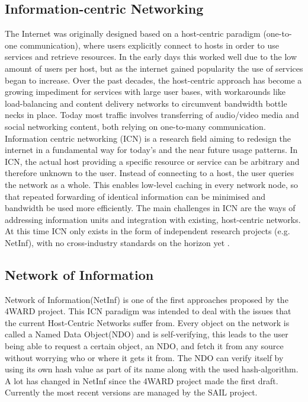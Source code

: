 \subsection{Information-centric Networking}
\label{sec:netinf}
The Internet was originally designed based on a host-centric paradigm (one-to-one communication), where users explicitly connect to hosts in order to use services and retrieve resources. In the early days this worked well due to the low amount of users per host, but as the internet gained popularity the use of services began to increase. Over the past decades, the host-centric approach has become a growing impediment for services with large user bases, with workarounds like load-balancing and content delivery networks to circumvent bandwidth bottle necks in place. Today most traffic involves transferring of audio/video media and social networking content, both relying on one-to-many communication. Information centric networking (ICN) is a research field aiming to redesign the internet in a fundamental way for today's and the near future usage patterns. In ICN, the actual host providing a specific resource or service can be arbitrary and therefore unknown to the user. Instead of connecting to a host, the user queries the network as a whole. This enables low-level caching in every network node, so that repeated forwarding of identical information can be minimised and bandwidth be used more efficiently. The main challenges in ICN are the ways of addressing information units and integration with existing, host-centric networks. At this time ICN only exists in the form of independent research projects (e.g. NetInf), with no cross-industry standards on the horizon yet \cite{ICNarticle}. 


\subsection{Network of Information}
Network of Information(NetInf) is one of the first approaches proposed by the 4WARD project. \cite{4ward} This ICN paradigm was intended to deal with the issues that the current Host-Centric Networks suffer from. Every object on the network is called a Named Data Object(NDO) and is self-verifying, this leads to the user being able to request a certain object, an NDO, and fetch it from any source without worrying who or where it gets it from. The NDO can verify itself by using its own hash value as part of its name along with the used hash-algorithm.
A lot has changed in NetInf since the 4WARD project made the first draft. Currently the most recent versions are managed by the SAIL project. \cite{netinfproto}

